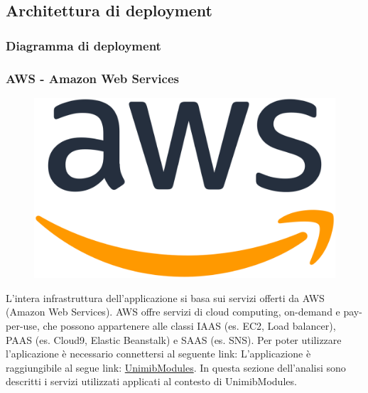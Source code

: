 \documentclass[12pt]{article}
\begin{document}
\subsection{Architettura di deployment}
\subsubsection{Diagramma di deployment}
\subsubsection{AWS - Amazon Web Services}
\begin{figure}[H]
\includegraphics[scale=0.08, left]{aws-logo.png}
\end{figure}
L'intera infrastruttura dell'applicazione si basa sui servizi offerti da AWS (Amazon Web Services). AWS offre servizi di cloud computing, on-demand e pay-per-use, che possono appartenere alle classi IAAS (es. EC2, Load balancer), PAAS (es. Cloud9, Elastic Beanstalk) e SAAS (es. SNS). Per poter utilizzare l'aplicazione è necessario connettersi al seguente link: L'applicazione è raggiungibile al segue link: \href{http://unimibquestionari-env.eba-3behr9mi.eu-central-1.elasticbeanstalk.com/}{UnimibModules}. In questa sezione dell'analisi sono descritti i servizi utilizzati applicati al contesto di UnimibModules. 
\end{document}
